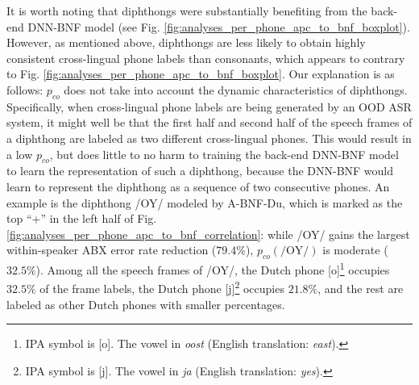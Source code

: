 \documentclass[transmag]{IEEEtran}
\begin{document}
It is worth noting that diphthongs 
were substantially benefiting from the back-end DNN-BNF model (see Fig. \ref{fig:analyses_per_phone_apc_to_bnf_boxplot}). 
However,  as mentioned above, diphthongs are less likely to obtain highly consistent cross-lingual phone labels than consonants, which appears to contrary to Fig. \ref{fig:analyses_per_phone_apc_to_bnf_boxplot}.
Our explanation is as follows: $p_{co}$ does not take into account the dynamic characteristics of diphthongs. Specifically, when cross-lingual phone labels are being generated by an OOD ASR system, it might well be that the first half and second half of the speech frames of a diphthong are labeled as two different cross-lingual phones. This would result in a low $p_{co}$, but does little to no harm to training the back-end DNN-BNF model to learn the representation of such a diphthong, because   the DNN-BNF would learn to represent the diphthong as a sequence of two consecutive phones. An example is the diphthong /OY/ modeled by A-BNF-Du, which is marked as the top “+” in the left half of Fig. \ref{fig:analyses_per_phone_apc_to_bnf_correlation}: while /OY/ gains the largest within-speaker ABX error rate reduction ($79.4\%$), $p_{co}(\mathrm{/OY/})$ is moderate ($32.5\%$). Among all the speech frames of /OY/, the Dutch phone [o]\footnote{IPA symbol is [o\textlengthmark]. The vowel in \textit{oost} (English translation: \textit{east}).} occupies $32.5\%$ of the frame labels, the Dutch phone [j]\footnote{IPA symbol is [j]. The vowel in \textit{ja} (English translation: \textit{yes}).} occupies $21.8\%$, and the rest are labeled as other Dutch phones with smaller percentages.



\end{document}
